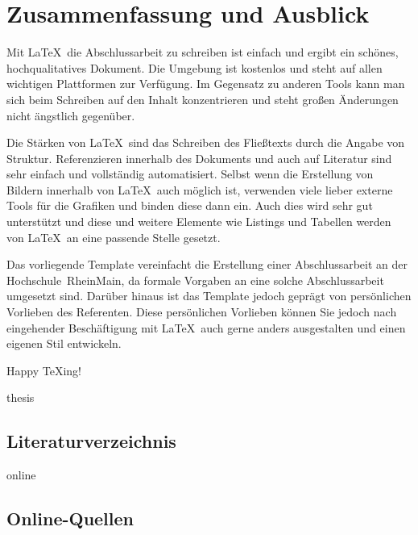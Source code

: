 \documentclass[11pt,a4paper]{report}
\begin{document}
\chapter{Zusammenfassung und Ausblick} \label{chap:fazit}

Mit \LaTeX\ die Abschlussarbeit zu schreiben ist 
einfach und ergibt ein schönes, hochqualitatives Dokument.
Die Umgebung ist kostenlos und steht auf allen wichtigen
Plattformen zur Verfügung.
Im Gegensatz zu anderen Tools kann man sich beim Schreiben 
auf den Inhalt konzentrieren und steht großen Änderungen 
nicht ängstlich gegenüber.

Die Stärken von \LaTeX\ sind das Schreiben des Fließtexts
durch die Angabe von Struktur. 
Referenzieren innerhalb des Dokuments und auch auf 
Literatur sind sehr einfach und vollständig automatisiert. 
Selbst wenn die Erstellung von Bildern innerhalb von
\LaTeX\ auch möglich ist, verwenden viele lieber externe 
Tools für die Grafiken und binden diese dann ein. 
Auch dies wird sehr gut unterstützt und diese und
weitere Elemente wie Listings und Tabellen werden
von \LaTeX\ an eine passende Stelle gesetzt.

Das vorliegende Template vereinfacht die Erstellung
einer Abschlussarbeit an der Hochschule~RheinMain,
da formale Vorgaben an eine solche Abschlussarbeit
umgesetzt sind. 
Darüber hinaus ist das Template jedoch geprägt von 
persönlichen Vorlieben des Referenten. 
Diese persönlichen Vorlieben können Sie jedoch 
nach eingehender Beschäftigung mit \LaTeX\ auch gerne 
anders ausgestalten und einen eigenen Stil entwickeln.

Happy \TeX ing! 

\newpage


\begin{btSect}{thesis} %
\section*{Literaturverzeichnis}
\btPrintCited
\end{btSect}
\begin{btSect}{online}
\section*{Online-Quellen}
\btPrintCited
\end{btSect}
\end{document}
